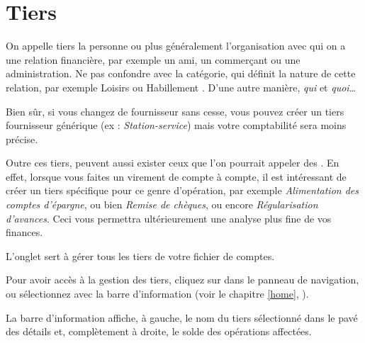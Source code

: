 
\chapter{Tiers\label{thirdparties}}


On appelle tiers la personne ou plus généralement l'organisation avec qui on a
une relation financière, par exemple un ami, un commerçant ou une administration.  Ne pas confondre avec la catégorie, qui définit  la nature de cette relation, par exemple \og Loisirs \fg{} ou \og Habillement \fg{}. D'une autre manière, \emph{qui} et \emph{quoi}\ldots

Bien sûr, si vous changez de fournisseur sans cesse, vous pouvez créer un tiers fournisseur générique (ex : \emph{Station-service}) mais votre comptabilité sera moins précise.

Outre ces tiers, peuvent aussi exister ceux que l'on pourrait appeler des 
. En effet, lorsque vous faites un virement de compte à compte, il est intéressant de créer un tiers spécifique pour ce genre d'opération, par exemple 
\emph{Alimentation des comptes d'épargne}, ou bien \emph{Remise de chèques}, ou encore \emph{Régularisation d'avances}. Ceci vous permettra ultérieurement une analyse plus fine de vos finances. 

L'onglet  sert à gérer tous les tiers de votre fichier de comptes.

Pour avoir accès à la gestion des tiers, cliquez sur  dans le panneau de navigation, ou sélectionnez  avec la barre d'information (voir le chapitre \vref{home}, ).

La barre d'information affiche, à gauche, le nom du tiers sélectionné dans le pavé des détails et, complètement à droite, le solde des opérations affectées.

